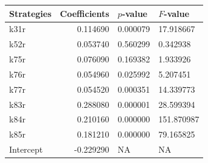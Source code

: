 \begin{tabular}{lrll}
\toprule
Strategies & Coefficients & $p$-value & $F$-value \\
\midrule
k31r & 0.114690 & 0.000079 & 17.918667 \\
k52r & 0.053740 & 0.560299 & 0.342938 \\
k75r & 0.076090 & 0.169382 & 1.933926 \\
k76r & 0.054960 & 0.025992 & 5.207451 \\
k77r & 0.054520 & 0.000351 & 14.339773 \\
k83r & 0.288080 & 0.000001 & 28.599394 \\
k84r & 0.210160 & 0.000000 & 151.870987 \\
k85r & 0.181210 & 0.000000 & 79.165825 \\
Intercept & -0.229290 & NA & NA \\
\bottomrule
\end{tabular}
